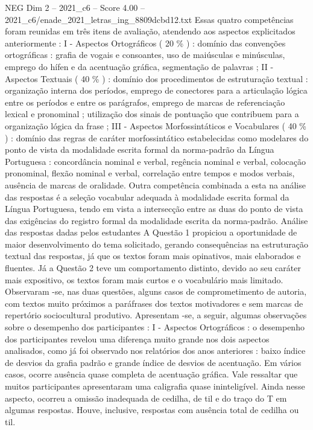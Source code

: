 \begin{textsample}{NEG Dim 2 – 2021\_c6 – Score 4.00 – 2021\_c6/enade\_2021\_letras\_ing\_8809dcbd12.txt}
Essas quatro competências foram reunidas em três itens de avaliação, atendendo aos aspectos explicitados anteriormente : I - Aspectos Ortográficos ( 20 \% ) : domínio das convenções ortográficas : grafia de vogais e consoantes, uso de maiúsculas e minúsculas, emprego do hífen e da acentuação gráfica, segmentação de palavras ; II - Aspectos Textuais ( 40 \% ) : domínio dos procedimentos de estruturação textual : organização interna dos períodos, emprego de conectores para a articulação lógica entre os períodos e entre os parágrafos, emprego de marcas de referenciação lexical e pronominal ; utilização dos sinais de pontuação que contribuem para a organização lógica da frase ; III - Aspectos Morfossintáticos e Vocabulares ( 40 \% ) : domínio das regras de caráter morfossintático estabelecidas como modelares do ponto de vista da modalidade escrita formal da norma-padrão da Língua Portuguesa : concordância nominal e verbal, regência nominal e verbal, colocação pronominal, flexão nominal e verbal, correlação entre tempos e modos verbais, ausência de marcas de oralidade.
Outra competência combinada a esta na análise das respostas é a seleção vocabular adequada à modalidade escrita formal da Língua Portuguesa, tendo em vista a intersecção entre as duas do ponto de vista das exigências do registro formal da modalidade escrita da norma-padrão.
Análise das respostas dadas pelos estudantes A Questão 1 propiciou a oportunidade de maior desenvolvimento do tema solicitado, gerando consequências na estruturação textual das respostas, já que os textos foram mais opinativos, mais elaborados e fluentes.
Já a Questão 2 teve um comportamento distinto, devido ao seu caráter mais expositivo, os textos foram mais curtos e o vocabulário mais limitado.
Observaram -se, nas duas questões, alguns casos de comprometimento de autoria, com textos muito próximos a paráfrases dos textos motivadores e sem marcas de repertório sociocultural produtivo.
Apresentam -se, a seguir, algumas observações sobre o desempenho dos participantes : I - Aspectos Ortográficos : o desempenho dos participantes revelou uma diferença muito grande nos dois aspectos analisados, como já foi observado nos relatórios dos anos anteriores : baixo índice de desvios da grafia padrão e grande índice de desvios de acentuação.
Em vários casos, ocorre ausência quase completa de acentuação gráfica.
Vale ressaltar que muitos participantes apresentaram uma caligrafia quase ininteligível.
Ainda nesse aspecto, ocorreu a omissão inadequada de cedilha, de til e do traço do T em algumas respostas.
Houve, inclusive, respostas com ausência total de cedilha ou til.

\end{textsample}
